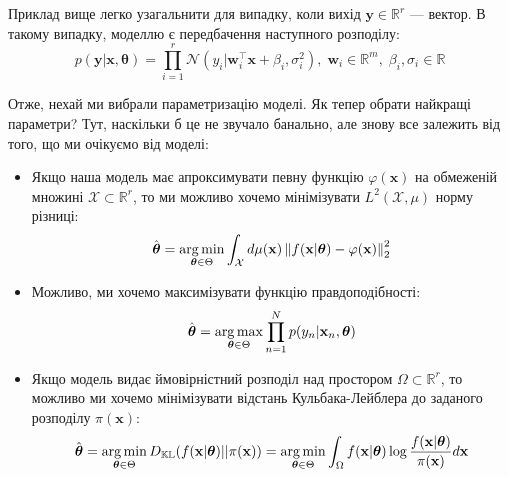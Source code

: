 \begin{remark}
	Приклад вище легко узагальнити для випадку, коли вихід $\mathbf{y} \in \mathbb{R}^r$ --- вектор. В такому випадку, 
	моделлю є передбачення наступного розподілу:
	\begin{equation}
		p(\mathbf{y}|\mathbf{x},\boldsymbol{\theta}) = \prod_{i=1}^r \mathcal{N}(y_i|\boldsymbol{w}_i^{\top}\mathbf{x} + \beta_i, \sigma_i^2), \; \boldsymbol{w}_i \in \mathbb{R}^m, \; \beta_i,\sigma_i \in \mathbb{R}
	\end{equation}
\end{remark}

Отже, нехай ми вибрали параметризацію моделі. Як тепер обрати найкращі параметри?
Тут, наскільки б це не звучало банально, але знову все залежить від того, що ми
очікуємо від моделі:
\begin{itemize}
	\item Якщо наша модель має апроксимувати певну функцію $\varphi(\mathbf{x})$ на 
	обмеженій множині $\mathcal{X} \subset \mathbb{R}^r$, то ми можливо хочемо 
	мінімізувати $L^2(\mathcal{X},\mu)$ норму різниці:
	\begin{equation*}
		\hat{\boldsymbol{\theta}} = \operatorname*{arg\,min}_{\boldsymbol{\theta} \in \Theta} \int_{\mathcal{X}} d\mu(\mathbf{x}) \left\| f(\mathbf{x}|\boldsymbol{\theta}) - \varphi(\mathbf{x}) \right\|_2^2
	\end{equation*}
	\item Можливо, ми хочемо максимізувати функцію правдоподібності:
	\begin{equation*}
		\hat{\boldsymbol{\theta}} = \operatorname*{arg\,max}_{\boldsymbol{\theta} \in \Theta} \prod_{n=1}^N p(y_n|\mathbf{x}_n,\boldsymbol{\theta})
	\end{equation*}
	\item Якщо модель видає ймовірністний розподіл над простором $\Omega \subset \mathbb{R}^r$, то можливо ми хочемо мінімізувати відстань Кульбака-Лейблера до заданого розподілу $\pi(\mathbf{x})$:
	\begin{equation*}
		\hat{\boldsymbol{\theta}} = \operatorname*{arg\,min}_{\boldsymbol{\theta} \in \Theta} D_{\mathbb{KL}}(f(\mathbf{x}|\boldsymbol{\theta})||\pi(\mathbf{x})) = \operatorname*{arg\,min}_{\boldsymbol{\theta} \in \Theta} \int_{\Omega} f(\mathbf{x} | \boldsymbol{\theta}) \log \frac{f(\mathbf{x} | \boldsymbol{\theta})}{\pi(\mathbf{x})}d\mathbf{x}
	\end{equation*}
\end{itemize}

